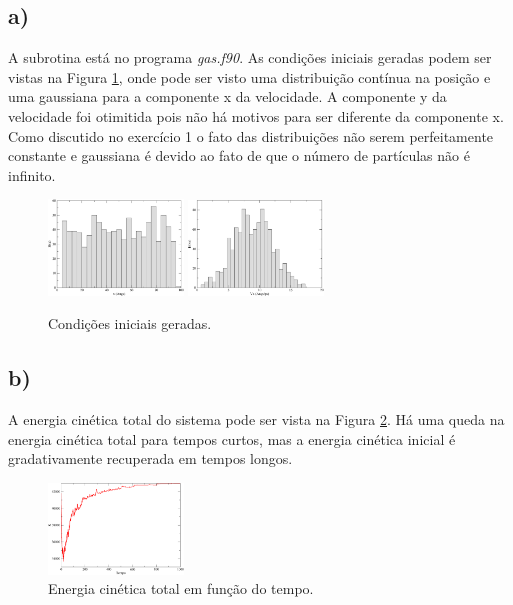 \documentclass[a4wide]{report}
\begin{document}
\subsection*{a)}
A subrotina está no programa \textit{gas.f90}. As condições iniciais geradas podem ser vistas na Figura \ref{3a}, onde pode ser visto uma distribuição contínua na posição e uma gaussiana para a componente x da velocidade. A componente y da velocidade foi otimitida pois não há motivos para ser diferente da componente x. Como discutido no exercício 1 o fato das distribuições não serem perfeitamente constante e gaussiana é devido ao fato de que o número de partículas não é infinito.
\begin{figure}[!htb]
\centering
\includegraphics[width=0.32\textwidth]{histogramax.pdf}
\includegraphics[width=0.32\textwidth]{histogramavx.pdf}
\caption{Condições iniciais geradas.}
\label{3a}
\end{figure}

\subsection*{b)}
A energia cinética total do sistema pode ser vista na Figura \ref{3b}. Há uma queda na energia cinética total para tempos curtos, mas a energia cinética inicial é gradativamente recuperada em tempos longos.

\begin{figure}[!htb]
\centering
\includegraphics[width=0.32\textwidth]{k.pdf}
\caption{Energia cinética total em função do tempo.}
\label{3b}
\end{figure}
\end{document}

